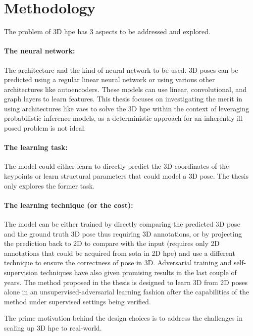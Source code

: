 \section{Methodology}
\label{sec:methodology}
The problem of 3D \ac{hpe} has 3 aspects to be addressed and explored.

\paragraph{The neural network:} The architecture and the kind of neural network to be used. 3D poses can be predicted using a regular linear neural network or using various other architectures like autoencoders. These models can use linear, convolutional, and graph layers to learn features. This thesis focuses on investigating the merit in using architectures like \acp{vae} to solve the 3D \ac{hpe} within the context of leveraging probabilistic inference models, as a deterministic approach for an inherently ill-posed problem is not ideal.

\paragraph{The learning task:} The model could either learn to directly predict the 3D coordinates of the keypoints or learn structural parameters that could model a 3D pose. The thesis only explores the former task.

\paragraph{The learning technique (or the cost):} The model can be either trained by directly comparing the predicted 3D pose and the ground truth 3D pose thus requiring 3D annotations, or by projecting the prediction back to 2D to compare with the input (requires only 2D annotations that could be acquired from \ac{sota} in 2D \ac{hpe}) and use a different technique to ensure the correctness of pose in 3D. Adversarial training and self-supervision techniques have also given promising results in the last couple of years. The method proposed in the thesis is designed to learn 3D from 2D poses alone in an unsupervised-adversarial learning fashion after the capabilities of the method under supervised settings being verified.

The prime motivation behind the design choices is to address the challenges in scaling up 3D \ac{hpe} to real-world.


